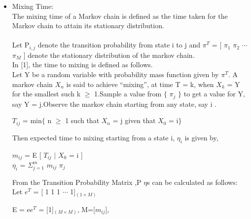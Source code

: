 \documentclass[12pt]{article}
\begin{document}
\begin{itemize}
\item Mixing Time: \\
The mixing time of a Markov chain is defined as the time taken for the Markov chain to attain its stationary distribution.
\\\\Let P$_{i,j}$ denote the transition probability from state i to j and $\pi^{T}$ = [ $\pi_{1}$ $\pi_{2}$ $\cdots$ $\pi_{M}$ ] denote the stationary distribution of the markov chain.\\In [1], the time to mixing is defined as follows.
\\Let Y be a random variable with probability mass function given by $\pi^{T}$. A  markov chain ${X_{n}}$ is said to achieve
“mixing”, at time T = k, when $X_{k}$ = Y for the smallest such k $\geq$ 1.Sample a value from $\lbrace$ $\pi_{j}$ $\rbrace$ to get a value for Y, say Y = j.Observe the markov chain starting from any state, say i . 
\begin{center}
$T_{ij}$ = min$\lbrace$ n $\geq$ 1 such that $X_{n}$ = j given that $X_{0}$ = i$\rbrace$  
\end{center}
Then expected time to mixing starting from a state i, $\eta_{i}$ is given by,
\begin{center}
$m_{ij}$ = E [  $T_{ij}$ $|$ $X_{0}$ = i ]\\
$\eta_{i}$  = $\Sigma^{m}_{j=1}$ $m_{ij}$ $\pi_{j}$
\end{center}

From the Transition Probability Matrix ,P $\eta$s can be calculated as follows:\\
Let $e^{T}$ = [ 1 1 1 $\cdots$ 1]$_{(1 \times M)}$

E = e$e^{T}$ = [1]$_{(M \times M)}$, \hspace{2pt}      M=[$m_{ij}$],


\end{itemize}
\end{document}
